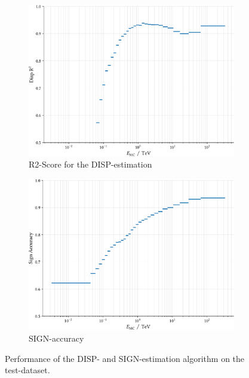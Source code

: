 \begin{figure}
    \begin{subfigure}{0.45\textwidth}
        \includegraphics[width=0.9\linewidth]{../analysis/plots/disp_test_r2_equal_filled.pdf} 
        \caption{R2-Score for the DISP-estimation}
    \end{subfigure}
    \begin{subfigure}{0.45\textwidth}
        \includegraphics[width=0.9\linewidth]{../analysis/plots/disp_test_acc_equal_filled.pdf}
        \caption{SIGN-accuracy}
    \end{subfigure}
    \caption{Performance of the DISP- and SIGN-estimation algorithm on the test-dataset.}
    \label{fig:disp_test_perf_2}
\end{figure}

